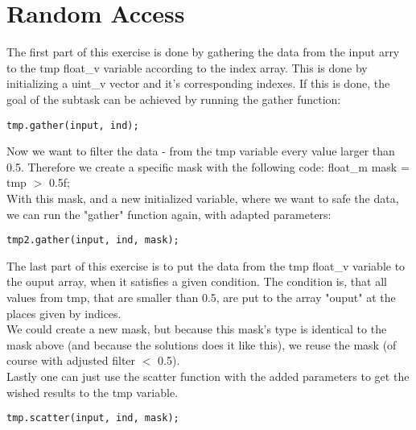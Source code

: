 \documentclass{article}
\begin{document}
\section{Random Access}
The first part of this exercise is done by gathering the data from the input
arry to the tmp float\_v variable according to the index array. This is done
by initializing a uint\_v vector and it's corresponding indexes. If this is
done, the goal of the subtask can be achieved by running the gather function:\\
\begin{lstlisting}[caption=gathering data]
    tmp.gather(input, ind);
\end{lstlisting}
Now we want to filter the data - from the tmp variable every value larger than
0.5. Therefore we create a specific mask with the following code:
float\_m mask = tmp $>$ 0.5f;\\
With this mask, and a new initialized variable, where we want to safe the data,
we can run the "gather" function again, with adapted parameters:\\
\begin{lstlisting}[caption=gathering filtered data]
    tmp2.gather(input, ind, mask);
\end{lstlisting}
The last part of this exercise is to put the data from the tmp float\_v variable
to the ouput array, when it satisfies a given condition.
The condition is, that all values from tmp, that are smaller than 0.5, are 
put to the array "ouput" at the places given by indices.\\
We could create a new mask, but because this mask's type is identical to
the mask above (and because the solutions does it like this), we reuse the mask
(of course with adjusted filter $<$ 0.5).\\
Lastly one can just use the scatter function with the added parameters to get the
wished results to the tmp variable.
\begin{lstlisting}[caption=scattering]
    tmp.scatter(input, ind, mask);
\end{lstlisting}
\end{document}
